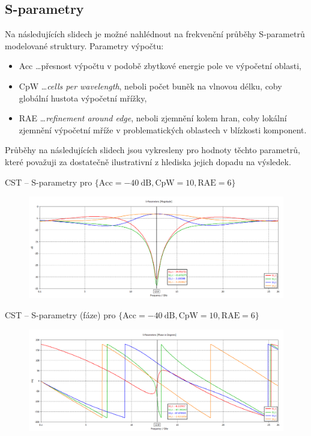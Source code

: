 \documentclass[aspectratio=169, 11pt, hyperref={unicode}]{beamer}
\begin{document}
\subsection{S-parametry}
\begin{frame}
    Na následujících slidech je možné nahlédnout na frekvenční průběhy S-parametrů modelované struktury. Parametry výpočtu:
    \begin{itemize}
        \item Acc \dots přesnost výpočtu v podobě zbytkové energie pole ve výpočetní oblasti,
        \item CpW \dots \emph{cells per wavelength}, neboli počet buněk na vlnovou délku, coby globální hustota výpočetní mřížky,
        \item RAE \dots \emph{refinement around edge}, neboli zjemnění kolem hran, coby lokální zjemnění výpočetní mříže v problematických oblastech v blízkosti komponent.
    \end{itemize}
    Průběhy na následujících slidech jsou vykresleny pro hodnoty těchto parametrů, které považuji za dostatečně ilustrativní z hlediska jejich dopadu na výsledek.
\end{frame}
\begin{frame}{CST -- S-parametry pro $\{\text{Acc} = -40\ \text{dB}, \text{CpW} = 10, \text{RAE} = 6\}$}
	\begin{figure}[!ht]
		\centering
		\includegraphics[width=.8\textwidth]{src/CST_S-Parameters_40dB_10-cpw_6-cntm.png}
	\end{figure}
\end{frame}
\begin{frame}{CST -- S-parametry (fáze) pro $\{\text{Acc} = -40\ \text{dB}, \text{CpW} = 10, \text{RAE} = 6\}$}
	\begin{figure}[!ht]
		\centering
		\includegraphics[width=.8\textwidth]{src/CST_S-Parameters_phase_40dB_10-cpw_6-cntm.png}
	\end{figure}
\end{frame}
\end{document}
